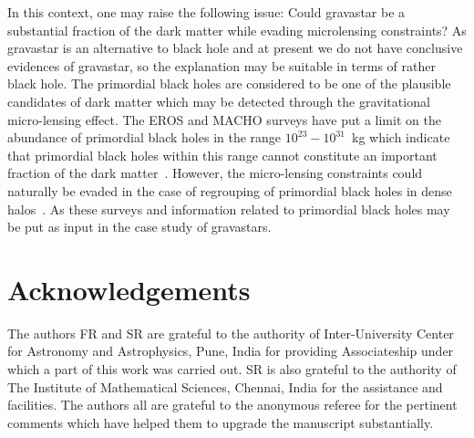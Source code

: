 \documentclass[preprint,12pt]{elsarticle}
\begin{document}
In this context, one may raise the following issue: Could gravastar be a substantial fraction of the dark matter while evading microlensing constraints? As gravastar is an alternative to black hole and at present we do not have conclusive evidences of gravastar, so the explanation may be suitable in terms of rather black hole. The primordial black holes are considered to be one of the plausible candidates of dark matter which may be detected through the gravitational micro-lensing effect. The EROS and MACHO surveys have put a limit on the abundance of primordial black holes in the range $10^{23} - 10^{31}$~kg which indicate that primordial black holes within this range cannot constitute an important fraction of the dark matter~\cite{Tisserand2007,Alcock1998}. However, the micro-lensing constraints could naturally be evaded in the case of regrouping of primordial black holes in dense halos~\cite{Clesse2017}. As these surveys and information related to primordial black holes may be put as input in the case study of gravastars.



\section*{Acknowledgements}
The authors FR and SR are grateful to the authority of
Inter-University Center for Astronomy and Astrophysics, Pune, India
for providing Associateship under which a part of this work was carried out.
SR is also grateful to the authority of The Institute of Mathematical Sciences,
Chennai, India for the assistance and facilities. The authors all are grateful to
the anonymous referee for the pertinent comments which
have helped them to upgrade the manuscript substantially.
\end{document}
